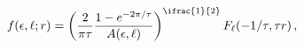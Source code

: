 \[\mathop{f\/}\nolimits\!\left(\epsilon,\ell;r\right)=\left(\frac{2}{\pi\tau}%
\frac{1-e^{-2\pi/\tau}}{A(\epsilon,\ell)}\right)^{\ifrac{1}{2}}\mathop{F_{\ell%
}\/}\nolimits\!\left(-1/\tau,\tau r\right),\]